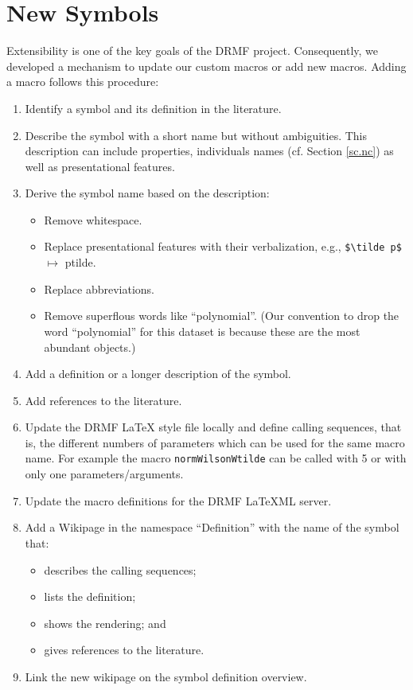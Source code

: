 \documentclass[]{article}
\newcommand{\LaTeXML}{\LaTeX ML}
\begin{document}
    \section{New Symbols}
Extensibility is one of the key goals of the DRMF project.
Consequently, we developed a mechanism to update our custom macros or add new macros.
Adding a macro follows this procedure:
\begin{enumerate}
                             \item Identify a symbol and its definition in the literature.
  \item Describe the symbol with a short name but without ambiguities.
  This description can include properties, individuals names (cf. Section \ref{sc.nc}) as well as presentational features.
  \item Derive the symbol name based on the description:\\[-0.5cm]
                             \begin{itemize}
                                 \item Remove whitespace.
    \item Replace presentational features with their verbalization, e.g., \verb#$\tilde p$# $\mapsto$ ptilde.
    \item Replace abbreviations.
    \item Remove superflous words like ``polynomial''. (Our convention to 
    drop the word ``polynomial'' for this dataset is because these are the 
    most abundant objects.)
                             \end{itemize}
                             \item Add a definition or a longer description of the symbol.
  \item Add references to the literature.
  \item Update the DRMF \LaTeX{} style file locally and define 
  calling sequences, that is, the different numbers of parameters which can be used for the same macro name.
  For example the macro \texttt{normWilsonWtilde} can be called with 5 or with only one parameters/arguments.
  \item Update the macro definitions for the DRMF \LaTeXML{} server.
  \item Add a Wikipage in the namespace ``Definition'' with the name of the symbol that:
  \begin{itemize}
                                                                                                                                                                                                   \item describes the calling sequences;
    \item lists the definition;
    \item shows the rendering; and
    \item gives references to the literature.
  \end{itemize}
                             \item Link the new wikipage on the symbol definition overview.
\end{enumerate}
\end{document}
